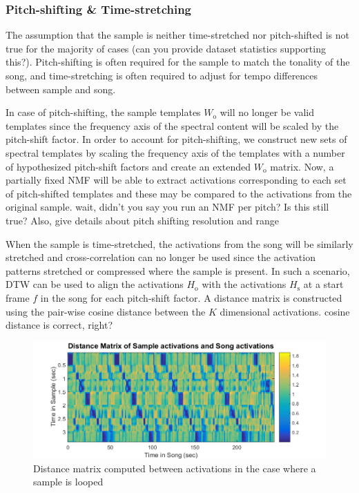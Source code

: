 \documentclass{article}
\begin{document}
\subsubsection{Pitch-shifting \& Time-stretching}
The assumption that the sample is neither time-stretched nor pitch-shifted is not true for the majority of cases {\color{red}(can you provide dataset statistics supporting this?)}. Pitch-shifting is often required for the sample to match the tonality of the song, and time-stretching is often required to adjust for tempo differences between sample and song.

In case of pitch-shifting, the sample templates $W_\mathrm{o}$ will no longer be valid templates since the frequency axis of the spectral content will be scaled by the pitch-shift factor. In order to account for pitch-shifting, we construct new sets of spectral templates by scaling the frequency axis of the templates with a number of hypothesized pitch-shift factors and create an extended $W_\mathrm{o}$ matrix. Now, a partially fixed NMF will be able to extract activations corresponding to each set of pitch-shifted templates and these may be compared to the activations from the original sample. {\color{red}wait, didn't you say you run an NMF per pitch? Is this still true? Also, give details about pitch shifting resolution and range}


When the sample is time-stretched, the activations from the song will be similarly stretched and cross-correlation can no longer be used since the activation patterns stretched or compressed where the sample is present.
%
In such a scenario, DTW can be used to align the activations $H_\mathrm{o}$ with the activations $H_\mathrm{s}$ at a start frame $f$ in the song for each pitch-shift factor. A distance matrix is constructed using the pair-wise cosine distance between the $K$ dimensional activations. {\color{red}cosine distance is correct, right?}
\begin{figure}[t]
\centering
\includegraphics[width=\linewidth]{distmat.png}
\caption{Distance matrix computed between activations in the case where a sample is looped}
\label{fig2}
\end{figure}
\end{document}
